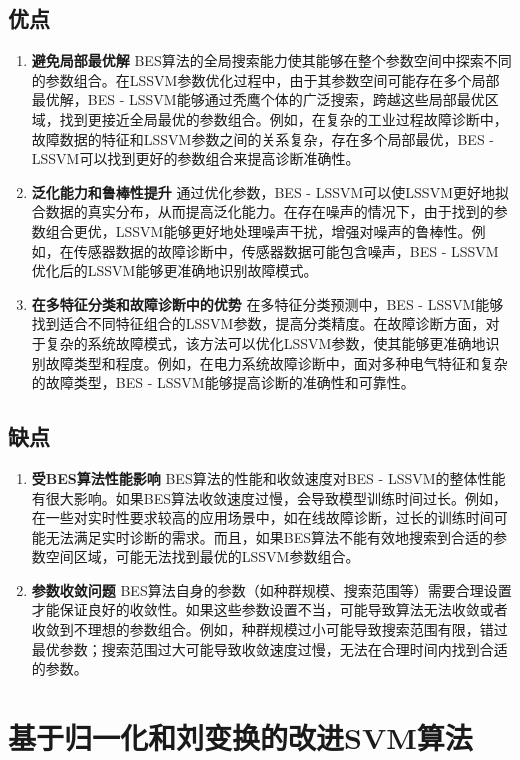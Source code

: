 \documentclass[12pt]{article}
\begin{document}
\subsection{优点}
\begin{enumerate}
    \item \textbf{避免局部最优解}
    BES算法的全局搜索能力使其能够在整个参数空间中探索不同的参数组合。在LSSVM参数优化过程中，由于其参数空间可能存在多个局部最优解，BES - LSSVM能够通过秃鹰个体的广泛搜索，跨越这些局部最优区域，找到更接近全局最优的参数组合。例如，在复杂的工业过程故障诊断中，故障数据的特征和LSSVM参数之间的关系复杂，存在多个局部最优，BES - LSSVM可以找到更好的参数组合来提高诊断准确性。
    \item \textbf{泛化能力和鲁棒性提升}
    通过优化参数，BES - LSSVM可以使LSSVM更好地拟合数据的真实分布，从而提高泛化能力。在存在噪声的情况下，由于找到的参数组合更优，LSSVM能够更好地处理噪声干扰，增强对噪声的鲁棒性。例如，在传感器数据的故障诊断中，传感器数据可能包含噪声，BES - LSSVM优化后的LSSVM能够更准确地识别故障模式。
    \item \textbf{在多特征分类和故障诊断中的优势}
    在多特征分类预测中，BES - LSSVM能够找到适合不同特征组合的LSSVM参数，提高分类精度。在故障诊断方面，对于复杂的系统故障模式，该方法可以优化LSSVM参数，使其能够更准确地识别故障类型和程度。例如，在电力系统故障诊断中，面对多种电气特征和复杂的故障类型，BES - LSSVM能够提高诊断的准确性和可靠性。
\end{enumerate}

\subsection{缺点}
\begin{enumerate}
    \item \textbf{受BES算法性能影响}
    BES算法的性能和收敛速度对BES - LSSVM的整体性能有很大影响。如果BES算法收敛速度过慢，会导致模型训练时间过长。例如，在一些对实时性要求较高的应用场景中，如在线故障诊断，过长的训练时间可能无法满足实时诊断的需求。而且，如果BES算法不能有效地搜索到合适的参数空间区域，可能无法找到最优的LSSVM参数组合。
    \item \textbf{参数收敛问题}
    BES算法自身的参数（如种群规模、搜索范围等）需要合理设置才能保证良好的收敛性。如果这些参数设置不当，可能导致算法无法收敛或者收敛到不理想的参数组合。例如，种群规模过小可能导致搜索范围有限，错过最优参数；搜索范围过大可能导致收敛速度过慢，无法在合理时间内找到合适的参数。
\end{enumerate}

\section{基于归一化和刘变换的改进SVM算法}
\end{document}
